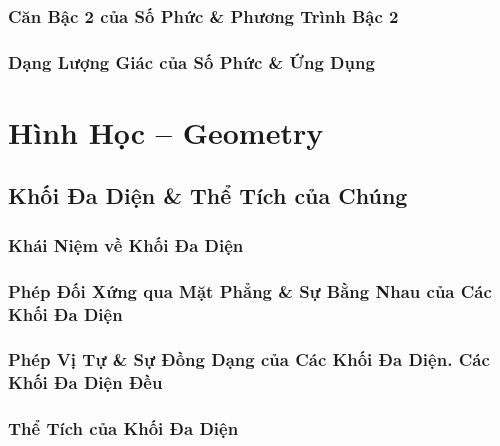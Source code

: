 \documentclass[oneside]{book}
\numberwithin{equation}{section}
\begin{document}

\section{Căn Bậc 2 của Số Phức \& Phương Trình Bậc 2}


\section{Dạng Lượng Giác của Số Phức \& Ứng Dụng}


\part{Hình Học -- Geometry}

\chapter{Khối Đa Diện \& Thể Tích của Chúng}

\section{Khái Niệm về Khối Đa Diện}


\section{Phép Đối Xứng qua Mặt Phẳng \& Sự Bằng Nhau của Các Khối Đa Diện}


\section{Phép Vị Tự \& Sự Đồng Dạng của Các Khối Đa Diện. Các Khối Đa Diện Đều}


\section{Thể Tích của Khối Đa Diện}
\end{document}
